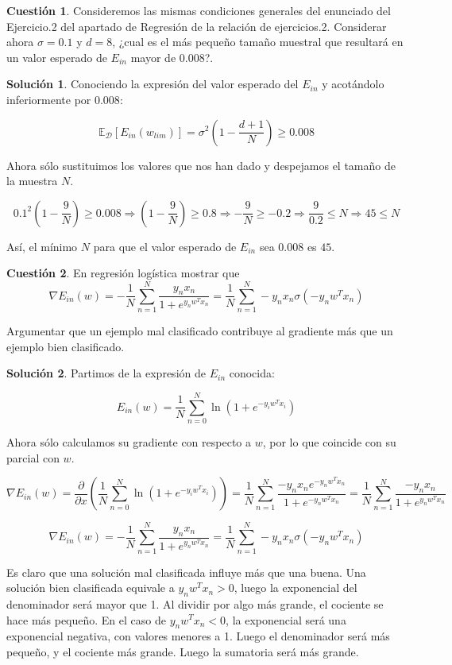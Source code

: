 \documentclass[a4paper, 11pt]{article}
\theoremstyle{definition}
\newtheorem{cuestion}{Cuestión}
\newtheorem*{solucion}{Solución}
\begin{document}
  \begin{cuestion}
    Consideremos las mismas condiciones generales del enunciado del Ejercicio.2 del apartado de Regresión de la relación de ejercicios.2. Considerar ahora $\sigma=0.1$ y $d=8$, ¿cual es el más pequeño tamaño muestral que resultará en un valor esperado de $E_{in}$ mayor de $0.008$?.
  \end{cuestion}


  \begin{solucion}
    Conociendo la expresión del valor esperado del $E_{in}$ y acotándolo inferiormente por $0.008$:

    $$\mathbb{E}_{\mathcal{D}} \left[ E_{in}(w_{lim})\right] = \sigma^2 \left(1 - \frac{d+1}{N}\right) \geq 0.008$$

    Ahora sólo sustituimos los valores que nos han dado y despejamos el tamaño de la muestra $N$.

    $$0.1^2 \left(1 - \frac{9}{N}\right) \geq 0.008 \Rightarrow \left(1 - \frac{9}{N}\right) \geq 0.8 \Rightarrow -\frac{9}{N} \geq -0.2 \Rightarrow \frac{9}{0.2} \leq N \Rightarrow 45 \leq N$$

    Así, el mínimo $N$ para que el valor esperado de $E_{in}$ sea $0.008$ es $45$.
  \end{solucion}

  \begin{cuestion}
    En regresión logística mostrar que
    \[
    \nabla E_{in}(w)=-\frac{1}{N}\sum_{n=1}^{N}\frac{y_nx_n}{1+e^{y_nw^Tx_n}}= \frac{1}{N}\sum_{n=1}^{N}-y_nx_n\sigma(-y_nw^Tx_n)
    \]

    Argumentar que un ejemplo mal clasificado contribuye  al gradiente más que un ejemplo bien clasificado.
  \end{cuestion}

  \begin{solucion}
    Partimos de la expresión de $E_{in}$ conocida:

    $$E_{in}(w) = \frac{1}{N} \sum_{n=0}^{N}\ln \left(1 + e^{-y_iw^Tx_i} \right) $$

    Ahora sólo calculamos su gradiente con respecto a $w$, por lo que coincide con su parcial con $w$.

    $$\nabla E_{in}(w)=\frac{\partial}{\partial x} \left( \frac{1}{N} \sum_{n=0}^{N}\ln \left(1 + e^{-y_iw^Tx_i} \right) \right) = \frac{1}{N}\sum_{n=1}^{N}\frac{-y_nx_ne^{-y_nw^Tx_n}}{1+e^{-y_nw^Tx_n}} = \frac{1}{N}\sum_{n=1}^{N}\frac{-y_nx_n}{1+e^{y_nw^Tx_n}} $$

    $$\nabla E_{in}(w)=-\frac{1}{N}\sum_{n=1}^{N}\frac{y_nx_n}{1+e^{y_nw^Tx_n}} = \frac{1}{N}\sum_{n=1}^{N}-y_nx_n\sigma(-y_nw^Tx_n)$$

    Es claro que una solución mal clasificada influye más que una buena. Una solución bien clasificada equivale a $y_nw^Tx_n > 0$, luego la exponencial del denominador será mayor que 1. Al dividir por algo más grande, el cociente se hace más pequeño. En el caso de $y_nw^Tx_n < 0$, la exponencial será una exponencial negativa, con valores menores a 1. Luego el denominador será más pequeño, y el cociente más grande. Luego la sumatoria será más grande.
  \end{solucion}
\end{document}
